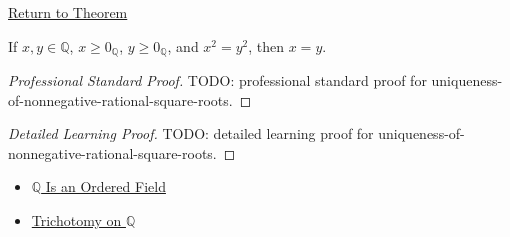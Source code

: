 \newpage
{}
\label{prf:uniqueness-of-nonnegative-rational-square-roots}

\begin{remark*}[Return]
\hyperref[thm:uniqueness-of-nonnegative-rational-square-roots]{Return to Theorem}
\end{remark*}

\begin{theorem*}
If $x,y\in\mathbb{Q}$, $x\ge 0_{\mathbb{Q}}$, $y\ge 0_{\mathbb{Q}}$, and
$x^2=y^2$, then $x=y$.
\end{theorem*}

\begin{proof}[Professional Standard Proof]
\LRAProofBodyStart
TODO: professional standard proof for uniqueness-of-nonnegative-rational-square-roots.
\end{proof}

\begin{proof}[Detailed Learning Proof]
\LRAProofBodyStart
TODO: detailed learning proof for uniqueness-of-nonnegative-rational-square-roots.
\end{proof}

\begin{remark*}
\end{remark*}

\begin{dependencies}
\begin{itemize}
  \item \hyperref[thm:q-is-an-ordered-field]{$\mathbb{Q}$ Is an Ordered Field}
  \item \hyperref[thm:trichotomy-on-q]{Trichotomy on $\mathbb{Q}$}
\end{itemize}
\end{dependencies}

\clearpage
